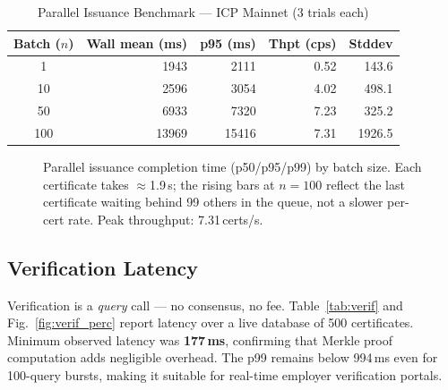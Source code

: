 \documentclass[conference]{IEEEtran}
\begin{document}
\begin{table}[t]
\caption{Parallel Issuance Benchmark --- ICP Mainnet (3 trials each)}
\label{tab:issuance}
\centering\small\renewcommand{\arraystretch}{1.1}
\begin{tabular}{@{}crrrr@{}}
\toprule
\textbf{Batch ($n$)} & \textbf{Wall mean (ms)} & \textbf{p95 (ms)} & \textbf{Thpt (cps)} & \textbf{Stddev} \\
\midrule
1   & 1943  & 2111  & 0.52 & 143.6 \\
10  & 2596  & 3054  & 4.02 & 498.1 \\
50  & 6933  & 7320  & 7.23 & 325.2 \\
100 & 13969 & 15416 & 7.31 & 1926.5 \\
\bottomrule
\end{tabular}
\end{table}

\begin{figure}[t]
\centering
{}
\caption{Parallel issuance completion time (p50/p95/p99) by batch size. Each certificate takes $\approx$1.9\,s; the rising bars at $n{=}100$ reflect the last certificate waiting behind 99 others in the queue, not a slower per-cert rate. Peak throughput: 7.31\,certs/s.}
\label{fig:issuance_perc}
\end{figure}

\subsection{Verification Latency}
Verification is a \textit{query} call — no consensus, no fee. Table~\ref{tab:verif} and Fig.~\ref{fig:verif_perc} report latency over a live database of 500 certificates. Minimum observed latency was \textbf{177\,ms}, confirming that Merkle proof computation adds negligible overhead. The p99 remains below 994\,ms even for 100-query bursts, making it suitable for real-time employer verification portals.
\end{document}

